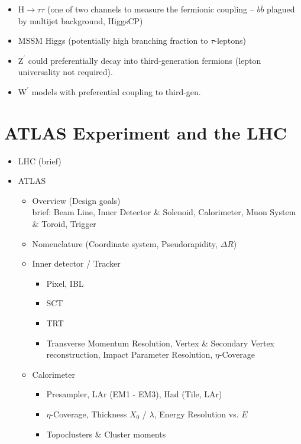 \begin{itemize}
\begin{itemize}
\begin{itemize}
  \item $\mathrm{H} \rightarrow \tau \tau$ (one of two channels to measure
    the fermionic coupling -- $b \bar{b}$ plagued by multijet background,
    HiggsCP)

  \item MSSM Higgs (potentially high branching fraction to $\tau$-leptons)

  \item $\mathrm{Z}^\prime$ could preferentially decay into third-generation
    fermions (lepton universality not required).

  \item $\mathrm{W}^\prime$ models with preferential coupling to third-gen.
  \end{itemize}
\end{itemize}

\end{itemize}

\section{ATLAS Experiment and the LHC}

\begin{itemize}
\item LHC (brief)

\item ATLAS
  \begin{itemize}
  \item Overview (Design goals) \\
    brief: Beam Line, Inner Detector \& Solenoid, Calorimeter, Muon System \&
    Toroid, Trigger

  \item Nomenclature (Coordinate system, Pseudorapidity, $\Delta R$)

  \item Inner detector / Tracker
    \begin{itemize}
    \item Pixel, IBL
    \item SCT
    \item TRT
    \item  Transverse Momentum Resolution, Vertex \& Secondary Vertex
      reconstruction, Impact Parameter Resolution, $\eta$-Coverage
    \end{itemize}

  \item Calorimeter
    \begin{itemize}
    \item Presampler, LAr (EM1 - EM3), Had (Tile, LAr)
    \item $\eta$-Coverage, Thickness $X_0$ / $\lambda$, Energy Resolution
      vs. $E$
    \item Topoclusters \& Cluster moments
    \end{itemize}

  \end{itemize}
\end{itemize}

